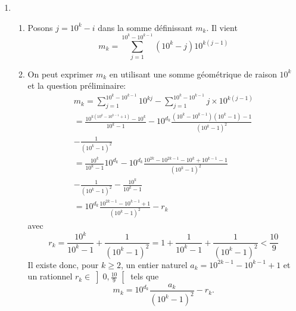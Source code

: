 \begin{enumerate}
 \item 
\begin{enumerate}
 \item Posons $j = 10^k -i$ dans la somme définissant $m_k$. Il vient
\begin{displaymath}
 m_k = \sum_{j=1}^{10^k - 10^{k-1}}(10^k -j)10^{k(j-1)}
\end{displaymath}

 \item On peut exprimer $m_k$ en utilisant une somme géométrique de raison $10^k$ et la question préliminaire:
\begin{multline*}
 m_k=\sum_{j=1}^{10^k - 10^{k-1}}10^{kj}
- \sum_{j=1}^{10^k - 10^{k-1}}j\times10^{k(j-1)}\\
=\frac{10^{k(10^k - 10^{k-1}+1)}-10^k}{10^k-1} 
-10^{d_k}\frac{(10^k - 10^{k-1})(10^k-1)-1}{(10^k-1)^2}\\-\frac{1}{(10^k-1)^2}\\
=\frac{10^k}{10^k-1}10^{d_k}-10^{d_k}\frac{10^{2k}-10^{2k-1}-10^k+10^{k-1}-1}{(10^k-1)^2}\\
-\frac{1}{(10^k-1)^2}-\frac{10^k}{10^k-1}\\
= 10^{d_k}\frac{10^{2k-1}-10^{k-1}+1}{(10^k-1)^2}-r_k
\end{multline*}
avec
\begin{displaymath}
 r_k = \frac{10^k}{10^k-1}+\frac{1}{(10^k-1)^2} = 1+\frac{1}{10^k-1}+\frac{1}{(10^k-1)^2}<\frac{10}{9}
\end{displaymath}
Il existe donc, pour $k\geq 2$, un entier naturel $a_k = 10^{2k-1}-10^{k-1}+1$ et un rationnel $r_k\in \left] 0,\frac{10}{9}\right[ $ tels que
\begin{displaymath}
 m_k = 10^{d_k}\frac{a_k}{(10^k -1)^2} - r_k .
\end{displaymath}
\end{enumerate}

\end{enumerate}


